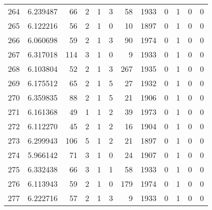 \begin{tabular}{lrrrrrrrrrrr}
264 &  6.239487 &   66 &      2 &        1 &      3 &              58 &  1933 &               0 &               1 &               0 &               0 \\
265 &  6.122216 &   56 &      2 &        1 &      0 &              10 &  1897 &               0 &               1 &               0 &               0 \\
266 &  6.060698 &   59 &      2 &        1 &      3 &              90 &  1974 &               0 &               1 &               0 &               0 \\
267 &  6.317018 &  114 &      3 &        1 &      0 &               9 &  1933 &               0 &               1 &               0 &               0 \\
268 &  6.103804 &   52 &      2 &        1 &      3 &             267 &  1935 &               0 &               1 &               0 &               0 \\
269 &  6.175512 &   65 &      2 &        1 &      5 &              27 &  1932 &               0 &               1 &               0 &               0 \\
270 &  6.359835 &   88 &      2 &        1 &      5 &              21 &  1906 &               0 &               1 &               0 &               0 \\
271 &  6.161368 &   49 &      1 &        1 &      2 &              39 &  1973 &               0 &               1 &               0 &               0 \\
272 &  6.112270 &   45 &      2 &        1 &      2 &              16 &  1904 &               0 &               1 &               0 &               0 \\
273 &  6.299943 &  106 &      5 &        1 &      2 &              21 &  1897 &               0 &               1 &               0 &               0 \\
274 &  5.966142 &   71 &      3 &        1 &      0 &              24 &  1907 &               0 &               1 &               0 &               0 \\
275 &  6.332438 &   66 &      3 &        1 &      1 &              58 &  1933 &               0 &               1 &               0 &               0 \\
276 &  6.113943 &   59 &      2 &        1 &      0 &             179 &  1974 &               0 &               1 &               0 &               0 \\
277 &  6.222716 &   57 &      2 &        1 &      3 &               9 &  1933 &               0 &               1 &               0 &               0 \\

\end{tabular}
